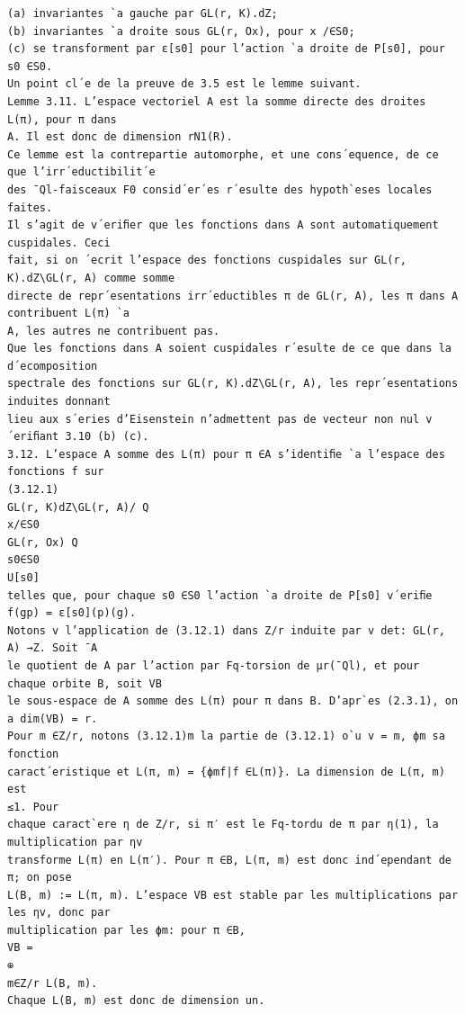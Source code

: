 \documentclass[11pt]{article}
\begin{document}
\begin{Verbatim}[breaklines=true,fontsize=\small]
(a) invariantes `a gauche par GL(r, K).dZ;
(b) invariantes `a droite sous GL(r, Ox), pour x /∈S0;
(c) se transforment par ε[s0] pour l’action `a droite de P[s0], pour s0 ∈S0.
Un point cl´e de la preuve de 3.5 est le lemme suivant.
Lemme 3.11. L’espace vectoriel A est la somme directe des droites L(π), pour π dans
A. Il est donc de dimension rN1(R).
Ce lemme est la contrepartie automorphe, et une cons´equence, de ce que l’irr´eductibilit´e
des ¯Ql-faisceaux F0 consid´er´es r´esulte des hypoth`eses locales faites.
Il s’agit de v´eriﬁer que les fonctions dans A sont automatiquement cuspidales. Ceci
fait, si on ´ecrit l’espace des fonctions cuspidales sur GL(r, K).dZ\GL(r, A) comme somme
directe de repr´esentations irr´eductibles π de GL(r, A), les π dans A contribuent L(π) `a
A, les autres ne contribuent pas.
Que les fonctions dans A soient cuspidales r´esulte de ce que dans la d´ecomposition
spectrale des fonctions sur GL(r, K).dZ\GL(r, A), les repr´esentations induites donnant
lieu aux s´eries d’Eisenstein n’admettent pas de vecteur non nul v´eriﬁant 3.10 (b) (c).
3.12. L’espace A somme des L(π) pour π ∈A s’identiﬁe `a l’espace des fonctions f sur
(3.12.1)
GL(r, K)dZ\GL(r, A)/ Q
x/∈S0
GL(r, Ox) Q
s0∈S0
U[s0]
telles que, pour chaque s0 ∈S0 l’action `a droite de P[s0] v´eriﬁe f(gp) = ε[s0](p)(g).
Notons v l’application de (3.12.1) dans Z/r induite par v det: GL(r, A) →Z. Soit ¯A
le quotient de A par l’action par Fq-torsion de µr(¯Ql), et pour chaque orbite B, soit VB
le sous-espace de A somme des L(π) pour π dans B. D’apr`es (2.3.1), on a dim(VB) = r.
Pour m ∈Z/r, notons (3.12.1)m la partie de (3.12.1) o`u v = m, ϕm sa fonction
caract´eristique et L(π, m) = {ϕmf|f ∈L(π)}. La dimension de L(π, m) est
≤1. Pour
chaque caract`ere η de Z/r, si π′ est le Fq-tordu de π par η(1), la multiplication par ηv
transforme L(π) en L(π′). Pour π ∈B, L(π, m) est donc ind´ependant de π; on pose
L(B, m) := L(π, m). L’espace VB est stable par les multiplications par les ηv, donc par
multiplication par les ϕm: pour π ∈B,
VB =
⊕
m∈Z/r L(B, m).
Chaque L(B, m) est donc de dimension un.


\end{Verbatim}
\end{document}
